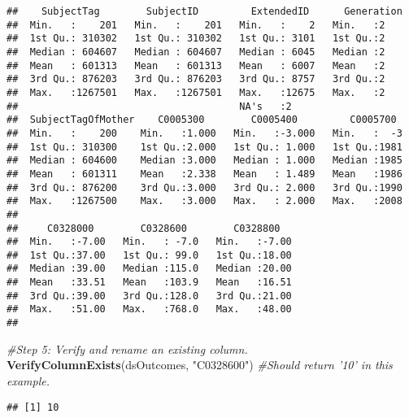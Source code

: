 \documentclass[smallextended]{svjour3}       %
\newenvironment{Shaded}{\begin{snugshade}}{\end{snugshade}}
\newcommand{\CommentTok}[1]{\textcolor[rgb]{0.56,0.35,0.01}{\textit{#1}}}
\newcommand{\KeywordTok}[1]{\textcolor[rgb]{0.13,0.29,0.53}{\textbf{#1}}}
\newcommand{\NormalTok}[1]{#1}
\newcommand{\StringTok}[1]{\textcolor[rgb]{0.31,0.60,0.02}{#1}}
\begin{document}
\begin{verbatim}
##    SubjectTag        SubjectID         ExtendedID      Generation
##  Min.   :    201   Min.   :    201   Min.   :    2   Min.   :2   
##  1st Qu.: 310302   1st Qu.: 310302   1st Qu.: 3101   1st Qu.:2   
##  Median : 604607   Median : 604607   Median : 6045   Median :2   
##  Mean   : 601313   Mean   : 601313   Mean   : 6007   Mean   :2   
##  3rd Qu.: 876203   3rd Qu.: 876203   3rd Qu.: 8757   3rd Qu.:2   
##  Max.   :1267501   Max.   :1267501   Max.   :12675   Max.   :2   
##                                      NA's   :2                   
##  SubjectTagOfMother    C0005300        C0005400         C0005700   
##  Min.   :    200    Min.   :1.000   Min.   :-3.000   Min.   :  -3  
##  1st Qu.: 310300    1st Qu.:2.000   1st Qu.: 1.000   1st Qu.:1981  
##  Median : 604600    Median :3.000   Median : 1.000   Median :1985  
##  Mean   : 601311    Mean   :2.338   Mean   : 1.489   Mean   :1986  
##  3rd Qu.: 876200    3rd Qu.:3.000   3rd Qu.: 2.000   3rd Qu.:1990  
##  Max.   :1267500    Max.   :3.000   Max.   : 2.000   Max.   :2008  
##                                                                    
##     C0328000        C0328600        C0328800    
##  Min.   :-7.00   Min.   : -7.0   Min.   :-7.00  
##  1st Qu.:37.00   1st Qu.: 99.0   1st Qu.:18.00  
##  Median :39.00   Median :115.0   Median :20.00  
##  Mean   :33.51   Mean   :103.9   Mean   :16.51  
##  3rd Qu.:39.00   3rd Qu.:128.0   3rd Qu.:21.00  
##  Max.   :51.00   Max.   :768.0   Max.   :48.00  
## 
\end{verbatim}

\begin{Shaded}
\begin{Highlighting}[]
\CommentTok{#Step 5: Verify and rename an existing column.}
\KeywordTok{VerifyColumnExists}\NormalTok{(dsOutcomes, }\StringTok{"C0328600"}\NormalTok{) }\CommentTok{#Should return '10' in this example.}
\end{Highlighting}
\end{Shaded}

\begin{verbatim}
## [1] 10
\end{verbatim}
\end{document}
